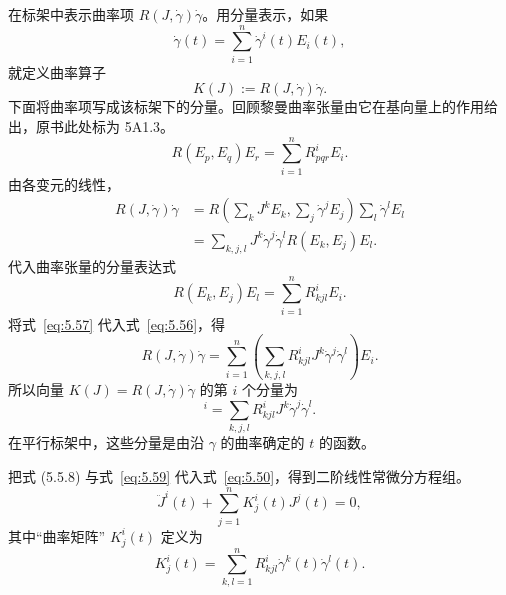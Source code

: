 在标架中表示曲率项 $R(J,\dot\gamma)\dot\gamma$。用分量表示，如果
\[
  \dot\gamma(t)=\sum_{i=1}^n\dot\gamma^i(t)E_i(t),
\]
就定义曲率算子
\begin{equation*}
  K(J):=R(J,\dot\gamma)\dot\gamma.
  \tag{5.55}\label{eq:5.55}
\end{equation*}
下面将曲率项写成该标架下的分量。回顾黎曼曲率张量由它在基向量上的作用给出，原书此处标为 5A1.3。
\[
  R(E_p,E_q)E_r=\sum_{i=1}^nR^i_{pqr}E_i.
\]
由各变元的线性，
\begin{equation*}
  \begin{aligned}
    R(J,\dot\gamma)\dot\gamma
    &=R\left(\sum_kJ^kE_k,\sum_j\dot\gamma^jE_j\right)
           \sum_l\dot\gamma^lE_l\\
    &=\sum_{k,j,l}J^k\dot\gamma^j\dot\gamma^lR(E_k,E_j)E_l.
  \end{aligned}
  \tag{5.56}\label{eq:5.56}
\end{equation*}
代入曲率张量的分量表达式
\begin{equation*}
  R(E_k,E_j)E_l=\sum_{i=1}^n R^i_{kjl}E_i.
  \tag{5.57}\label{eq:5.57}
\end{equation*}
将式~\eqref{eq:5.57} 代入式~\eqref{eq:5.56}，得
\begin{equation*}
  R(J,\dot\gamma)\dot\gamma
    =\sum_{i=1}^n\left(\sum_{k,j,l}R^i_{kjl}J^k\dot\gamma^j\dot\gamma^l\right)E_i.
  \tag{5.58}\label{eq:5.58}
\end{equation*}
所以向量 $K(J)=R(J,\dot\gamma)\dot\gamma$ 的第 $i$ 个分量为
\begin{equation*}
  [K(J)]^i=\sum_{k,j,l}R^i_{kjl}J^k\dot\gamma^j\dot\gamma^l.
  \tag{5.59}\label{eq:5.59}
\end{equation*}
在平行标架中，这些分量是由沿 $\gamma$ 的曲率确定的 $t$ 的函数。

把式 (5.5.8) 与式~\eqref{eq:5.59} 代入式~\eqref{eq:5.50}，得到二阶线性常微分方程组。
\begin{equation*}
  \ddot J^i(t)+\sum_{j=1}^nK^i_j(t)J^j(t)=0,
  \tag{5.60}\label{eq:5.60}
\end{equation*}
其中“曲率矩阵” $K^i_j(t)$ 定义为
\begin{equation*}
  K^i_j(t)=\sum_{k,l=1}^n R^i_{kjl}\dot\gamma^k(t)\dot\gamma^l(t).
  \tag{5.61}\label{eq:5.61}
\end{equation*}

